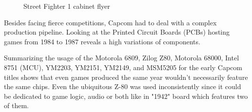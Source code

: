 \begin{figure}[H]
\caption*{Street Fighter 1 cabinet flyer}
\end{figure}


Besides facing fierce competitions, Capcom had to deal with a complex production pipeline. Looking at the Printed Circuit Boards (PCBs) hosting games from 1984 to 1987 reveals a high variations of components.

Summarizing the usage of the Motorola 6809, Zilog Z80, Motorola 68000, Intel 8751 (MCU), YM2203, YM2151, YM2149, and MSM5205 for the early Capcom titles shows that even games produced the same year wouldn't necessarily feature the same chips. Even the ubiquitous Z-80 was used inconsistently since it could be dedicated to game logic, audio or both like in "1942" board which features two of them.



